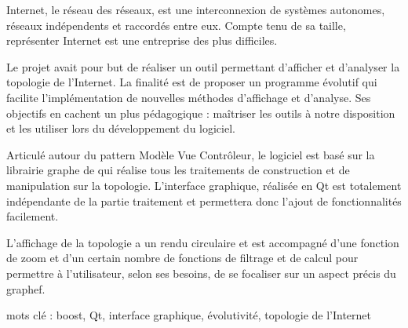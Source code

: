 \par
Internet, le réseau des réseaux, est une interconnexion de systèmes autonomes, réseaux indépendents et raccordés entre eux. Compte tenu de sa taille, représenter Internet est une entreprise des plus difficiles.

Le projet avait pour but de réaliser un outil permettant d'afficher et d'analyser la topologie de l'Internet. La finalité est de proposer un programme évolutif qui facilite l'implémentation de nouvelles méthodes d'affichage et d'analyse. Ses objectifs en cachent un plus pédagogique : maîtriser les outils à notre disposition et les utiliser lors du développement du logiciel.

Articulé autour du pattern Modèle Vue Contrôleur, le logiciel est basé sur la librairie graphe de \boost qui réalise tous les traitements de construction et de manipulation sur la topologie. L'interface graphique, réalisée en Qt est totalement indépendante de la partie traitement et permettera donc l'ajout de fonctionnalités facilement.

L'affichage de la topologie a un rendu circulaire et est accompagné d'une fonction de zoom et d'un certain nombre de fonctions de filtrage et de calcul pour permettre à l'utilisateur, selon ses besoins, de se focaliser sur un aspect précis du graphef.

mots cl\'e : boost, Qt, interface graphique, évolutivité, topologie de l'Internet







